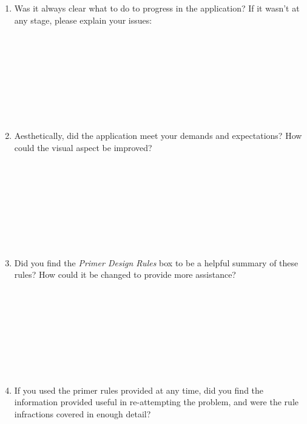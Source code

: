 \documentclass[A4paper]{article}
\begin{document}
\begin{enumerate}
\item Was it always clear what to do to progress in the application? If it wasn't at any stage, please explain your issues:\\ \\ \\ \\ \\ \\ \\ \\ \\
\item Aesthetically, did the application meet your demands and expectations? How could the visual aspect be improved?\\ \\ \\ \\ \\ \\ \\ \\ \\
\item Did you find the \textit{Primer Design Rules} box to be a helpful summary of these rules? How could it be changed to provide more assistance? \\ \\ \\ \\ \\ \\ \\ \\ \\
\item If you used the primer rules provided at any time, did you find the information provided useful in re-attempting the problem, and were the 
	 rule infractions covered in enough detail? \\ \\ \\ \\ \\ \\ \\ \\ \\

\end{enumerate}
\end{document}
